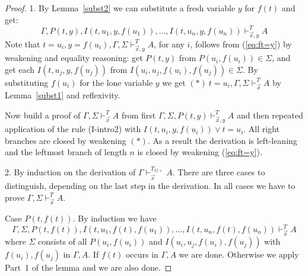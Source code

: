 \documentclass[10pt,a4paper]{article}
\begin{document}
\begin{proof}
1. By Lemma~\ref{subst2} we can substitute a fresh variable $y$ for $f(t)$ and get:
\begin{equation}\label{eq:ft=y}
\Gamma,P(t,y),  I(t,u_1,y,f(u_1)),\ldots,I(t,u_n,y,f(u_n))\vdash_{\vec{x},y}^{T} A
\end{equation}
Note that $t=u_i,y=f(u_i),\Gamma,\Sigma\vdash_{\vec{x},y}^{T} A$,
for any $i$, follows from (\ref{eq:ft=y}) by weakening and equality reasoning:
get $P(t,y)$ from $P(u_i,f(u_i))\in\Sigma$, and get each $I(t,u_j,y,f(u_j))$ 
from $I(u_i,u_j,f(u_i),f(u_j))\in\Sigma$. 
By substituting $f(u_i)$ for the
lone variable $y$ we get $(\ast)~t=u_i,\Gamma,\Sigma\vdash_{\vec{x}}^{T} A$
by Lemma~\ref{subst1} and reflexivity.

Now build a proof of $\Gamma,\Sigma\vdash_{\vec{x}}^{T} A$ from first 
$\Gamma,\Sigma,P(t,y)\vdash_{\vec{x},y}^{T} A$ and then repeated
application of the rule (I-intro2) with $I(t,u_i,y,f(u_i)) \lor t=u_i$. 
All right branches are closed by weakening  $(\ast)$. As a result the derivation
is left-leaning and the leftmost branch of length $n$ is closed by
weakening (\ref{eq:ft=y}).

2. By induction on the derivation of $\Gamma\vdash_{\vec{x}}^{T_{I\!f{+}}} A$.
There are three cases to distinguish, depending on the last step in the derivation.
In all cases we have to prove $\Gamma,\Sigma\vdash_{\vec{x}}^{T} A$.

Case $P(t,f(t))$. By induction we have 
\begin{equation}\label{ih:Ptft}
\Gamma,\Sigma,P(t,f(t)), I(t,u_1,f(t),f(u_1)),\ldots,I(t,u_n,f(t),f(u_n))\vdash_{\vec{x}}^{T} A
\end{equation}
where $\Sigma$ consists of all $P(u_i,f(u_i))$ and $I(u_i,u_j,f(u_i),f(u_j))$
with $f(u_i),f(u_j)$ in $\Gamma,A$. 
If $f(t)$ occurs in $\Gamma,A$ we are done.
Otherwise we apply Part~1 of the lemma and we are also done.


\end{proof}
\end{document}
